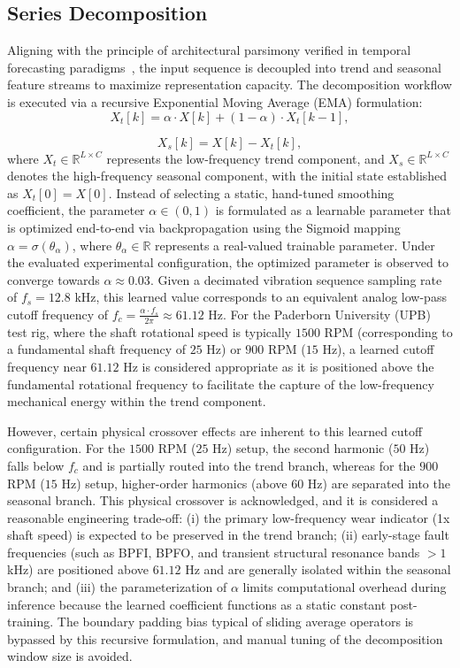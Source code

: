 \documentclass[cmes,article,submit,moreauthors,pdftex]{Definitions/tsp}
\begin{document}
\subsection{Series Decomposition} \label{sect:s3dot2}
Aligning with the principle of architectural parsimony verified in temporal forecasting paradigms~\cite{ref-17}, the input sequence is decoupled into trend and seasonal feature streams to maximize representation capacity. The decomposition workflow is executed via a recursive Exponential Moving Average (EMA) formulation:
\begin{equation}
X_{t}[k] = \alpha \cdot X[k] + (1 - \alpha) \cdot X_{t}[k-1],
\tag{1}
\end{equation}

\begin{equation}
X_{s}[k] = X[k] - X_{t}[k],
\tag{2}
\end{equation}
where $X_{t} \in \mathbb{R}^{L \times C}$ represents the low-frequency trend component, and $X_{s} \in \mathbb{R}^{L \times C}$ denotes the high-frequency seasonal component, with the initial state established as $X_{t}[0] = X[0]$. Instead of selecting a static, hand-tuned smoothing coefficient, the parameter $\alpha \in (0, 1)$ is formulated as a learnable parameter that is optimized end-to-end via backpropagation using the Sigmoid mapping $\alpha = \sigma(\theta_\alpha)$, where $\theta_\alpha \in \mathbb{R}$ represents a real-valued trainable parameter. Under the evaluated experimental configuration, the optimized parameter is observed to converge towards $\alpha \approx 0.03$. Given a decimated vibration sequence sampling rate of $f_s = 12.8$ kHz, this learned value corresponds to an equivalent analog low-pass cutoff frequency of $f_c = \frac{\alpha \cdot f_s}{2\pi} \approx 61.12$ Hz. For the Paderborn University (UPB) test rig, where the shaft rotational speed is typically $1500$ RPM (corresponding to a fundamental shaft frequency of $25$ Hz) or $900$ RPM ($15$ Hz), a learned cutoff frequency near $61.12$ Hz is considered appropriate as it is positioned above the fundamental rotational frequency to facilitate the capture of the low-frequency mechanical energy within the trend component.

However, certain physical crossover effects are inherent to this learned cutoff configuration. For the $1500$ RPM ($25$ Hz) setup, the second harmonic ($50$ Hz) falls below $f_c$ and is partially routed into the trend branch, whereas for the $900$ RPM ($15$ Hz) setup, higher-order harmonics (above $60$ Hz) are separated into the seasonal branch. This physical crossover is acknowledged, and it is considered a reasonable engineering trade-off: (i) the primary low-frequency wear indicator (1x shaft speed) is expected to be preserved in the trend branch; (ii) early-stage fault frequencies (such as BPFI, BPFO, and transient structural resonance bands $>1$ kHz) are positioned above $61.12$ Hz and are generally isolated within the seasonal branch; and (iii) the parameterization of $\alpha$ limits computational overhead during inference because the learned coefficient functions as a static constant post-training. The boundary padding bias typical of sliding average operators is bypassed by this recursive formulation, and manual tuning of the decomposition window size is avoided.
\end{document}
